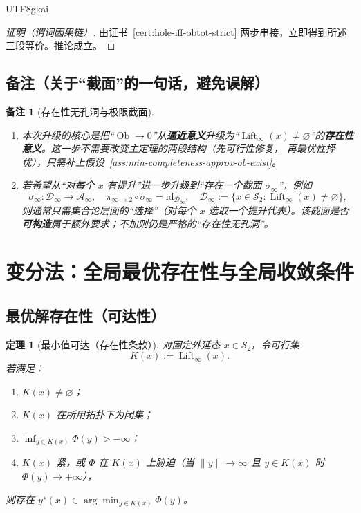 \documentclass[12pt]{article}
\newtheorem{theorem}{定理}[section]
\newtheorem{remark}{备注}[section]
\newcommand{\Ob}{\operatorname{Ob}}
\newcommand{\Lift}{\operatorname{Lift}}
\begin{document}
\begin{CJK*}{UTF8}{gkai}
\begin{proof}[证明（谓词因果链）]
由证书~\ref{cert:hole-iff-obtot-strict} 两步串接，立即得到所述三段等价。推论成立。
\end{proof}

\subsection{备注（关于“截面”的一句话，避免误解）}

\begin{remark}[存在性无孔洞与极限截面]
\begin{enumerate}
\item 本次升级的核心是把“$\Ob\to0$”从\textbf{逼近意义}升级为“$\Lift_\infty(x)\neq\varnothing$”的\textbf{存在性意义}。这一步不需要改变主定理的两段结构（先可行性修复，
  再最优性择优），只需补上假设~\ref{ass:min-completeness-approx-ob-exist}。
\item 若希望从“对每个 $x$ 有提升”进一步升级到“存在一个截面 $\sigma_\infty$”，例如
\[
\sigma_\infty:\mathcal D_\infty\to\mathcal A_\infty,\quad
\pi_{\infty\to2}\circ\sigma_\infty=\mathrm{id}_{\mathcal D_\infty},
\quad
\mathcal D_\infty:=\{x\in\mathcal S_2:\Lift_\infty(x)\neq\varnothing\},
\]
则通常只需集合论层面的“选择”（对每个 $x$ 选取一个提升代表）。该截面是否\textbf{可构造}属于额外要求；不加则仍是严格的“存在性无孔洞”。
\end{enumerate}
\end{remark}

\section{变分法：全局最优存在性与全局收敛条件}

\subsection{最优解存在性（可达性）}

\begin{theorem}[最小值可达（存在性条款）]\label{thm:existence-minimizer}
对固定外延态 $x\in\mathcal S_2$，令可行集
\[
K(x):=\Lift_\infty(x).
\]
若满足：
\begin{enumerate}
\item $K(x)\neq\varnothing$；
\item $K(x)$ 在所用拓扑下为闭集；
\item $\inf_{y\in K(x)}\Phi(y)>-\infty$；
\item $K(x)$ 紧，或 $\Phi$ 在 $K(x)$ 上胁迫（当 $\|y\|\to\infty$ 且 $y\in K(x)$ 时 $\Phi(y)\to+\infty$），
\end{enumerate}
则存在
\(
y^\star(x)\in\arg\min_{y\in K(x)}\Phi(y)
\)。
\end{theorem}


\end{CJK*}
\end{document}
